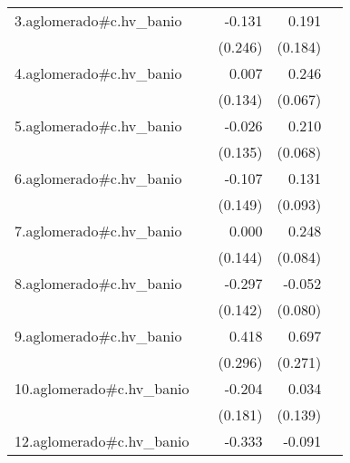 {\begin{longtable}{l*{4}{D{.}{.}{-1}}}
\addlinespace
3.aglomerado#c.hv\_banio&                     &      -0.131         &       0.191         &                     \\
            &                     &     (0.246)         &     (0.184)         &                     \\
\addlinespace
4.aglomerado#c.hv\_banio&                     &       0.007         &       0.246\sym{***}&                     \\
            &                     &     (0.134)         &     (0.067)         &                     \\
\addlinespace
5.aglomerado#c.hv\_banio&                     &      -0.026         &       0.210\sym{**} &                     \\
            &                     &     (0.135)         &     (0.068)         &                     \\
\addlinespace
6.aglomerado#c.hv\_banio&                     &      -0.107         &       0.131         &                     \\
            &                     &     (0.149)         &     (0.093)         &                     \\
\addlinespace
7.aglomerado#c.hv\_banio&                     &       0.000         &       0.248\sym{**} &                     \\
            &                     &     (0.144)         &     (0.084)         &                     \\
\addlinespace
8.aglomerado#c.hv\_banio&                     &      -0.297\sym{*}  &      -0.052         &                     \\
            &                     &     (0.142)         &     (0.080)         &                     \\
\addlinespace
9.aglomerado#c.hv\_banio&                     &       0.418         &       0.697\sym{*}  &                     \\
            &                     &     (0.296)         &     (0.271)         &                     \\
\addlinespace
10.aglomerado#c.hv\_banio&                     &      -0.204         &       0.034         &                     \\
            &                     &     (0.181)         &     (0.139)         &                     \\
\addlinespace
12.aglomerado#c.hv\_banio&                     &      -0.333\sym{*}  &      -0.091         &                     \\

\end{longtable}}
